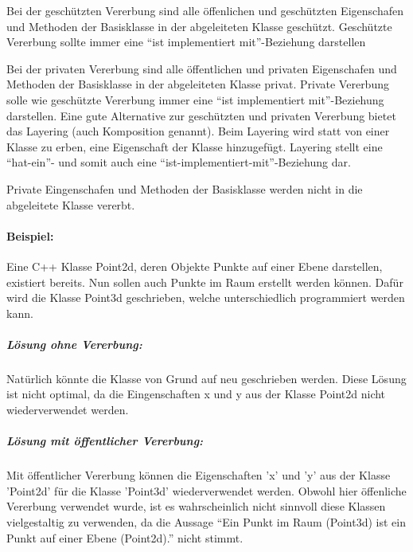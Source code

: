 			Bei der geschützten Vererbung sind alle öffenlichen und geschützten Eigenschafen und Methoden der Basisklasse in
			der abgeleiteten Klasse geschützt. Geschützte Vererbung sollte immer eine ``ist implementiert mit''-Beziehung darstellen
			
			Bei der privaten Vererbung sind alle öffentlichen und privaten Eigenschafen und Methoden der Basisklasse in der
			abgeleiteten Klasse privat.
			Private Vererbung solle wie geschützte Vererbung immer eine ``ist implementiert mit''-Beziehung darstellen.
			Eine gute Alternative zur geschützten und privaten Vererbung bietet das Layering (auch Komposition genannt). Beim
			Layering wird statt von einer Klasse zu erben, eine Eigenschaft
			der Klasse hinzugefügt. Layering stellt eine ``hat-ein''- und somit auch eine ``ist-implementiert-mit''-Beziehung dar.
			
			Private Eingenschafen und Methoden der Basisklasse werden nicht in die abgeleitete Klasse vererbt.
			
			\paragraph*{Beispiel:}
				Eine C++ Klasse Point2d, deren Objekte Punkte auf einer Ebene darstellen, existiert bereits.
				\UseRawInputEncoding{}
				Nun sollen auch Punkte im Raum erstellt werden können. Dafür wird die Klasse Point3d geschrieben, welche
				unterschiedlich programmiert werden kann.
			
			\subparagraph*{Lösung ohne Vererbung:}
			Natürlich könnte die Klasse von Grund auf neu geschrieben werden.
			\UseRawInputEncoding{}
			Diese Lösung ist nicht optimal, da die Eingenschaften x und y aus der Klasse Point2d nicht wiederverwendet werden.
			
			\subparagraph*{Lösung mit öffentlicher Vererbung:}
			Mit öffentlicher Vererbung können die Eigenschaften 'x' und 'y' aus der Klasse 'Point2d' für die Klasse 'Point3d'
			wiederverwendet werden.
			\UseRawInputEncoding{}
			Obwohl hier öffenliche Vererbung verwendet wurde, ist es wahrscheinlich nicht sinnvoll diese Klassen vielgestaltig
			zu verwenden, da die Aussage ``Ein Punkt im Raum (Point3d) ist ein Punkt auf einer Ebene (Point2d).'' nicht stimmt.
			
